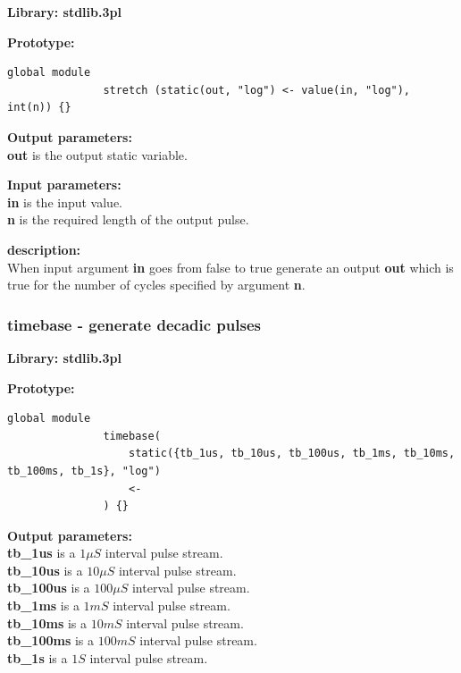             {\bf Library: stdlib.3pl}

            {\bf Prototype:} \\
            \vsp
            \begin{lstlisting}[gobble=12, language=threepl]
               global module
               stretch (static(out, "log") <- value(in, "log"), int(n)) {}
            \end{lstlisting}

            {\bf Output parameters:} \\
            {\bf out} is the output static variable.

            {\bf Input parameters:} \\
            {\bf in} is the input value.\\
            {\bf n} is the required length of the output pulse.

            {\bf description:} \\
            When input argument {\bf in} goes from false to true generate an
            output {\bf out} which is true for the number of cycles specified
            by argument {\bf n}.


        \subsubsection{timebase - generate decadic pulses}\label{sec:lmtimebase}

            {\bf Library: stdlib.3pl}

            {\bf Prototype:} \\
            \vsp
            \begin{lstlisting}[gobble=12, language=threepl]
               global module
               timebase(
                   static({tb_1us, tb_10us, tb_100us, tb_1ms, tb_10ms, tb_100ms, tb_1s}, "log")
                   <-
               ) {}
            \end{lstlisting}

            {\bf Output parameters:} \\
            {\bf tb\_1us} is a $1\mu S$ interval pulse stream. \\
            {\bf tb\_10us} is  a $10\mu S$ interval pulse stream. \\
            {\bf tb\_100us} is  a $100\mu S$ interval pulse stream. \\
            {\bf tb\_1ms} is  a $1mS$ interval pulse stream. \\
            {\bf tb\_10ms} is  a $10mS$ interval pulse stream. \\
            {\bf tb\_100ms} is  a $100mS$ interval pulse stream. \\
            {\bf tb\_1s} is  a $1S$ interval pulse stream. 

